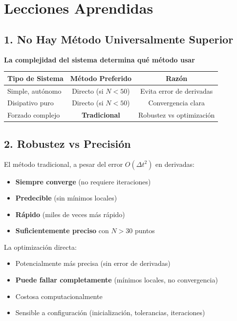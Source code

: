 \documentclass[11pt,a4paper]{article}
\begin{document}
\section{Lecciones Aprendidas}

\subsection{1. No Hay Método Universalmente Superior}

\begin{center}
\textbf{La complejidad del sistema determina qué método usar}
\end{center}

\begin{table}[H]
\centering
\begin{tabular}{lcc}
\toprule
\textbf{Tipo de Sistema} & \textbf{Método Preferido} & \textbf{Razón} \\
\midrule
Simple, autónomo & Directo (si $N < 50$) & Evita error de derivadas \\
Disipativo puro & Directo (si $N < 50$) & Convergencia clara \\
\rowcolor{yellow!30}
Forzado complejo & \textbf{Tradicional} & Robustez vs optimización \\
\bottomrule
\end{tabular}
\end{table}

\subsection{2. Robustez vs Precisión}

El método tradicional, a pesar del error $O(\Delta t^2)$ en derivadas:
\begin{itemize}
\item \textbf{Siempre converge} (no requiere iteraciones)
\item \textbf{Predecible} (sin mínimos locales)
\item \textbf{Rápido} (miles de veces más rápido)
\item \textbf{Suficientemente preciso} con $N > 30$ puntos
\end{itemize}

La optimización directa:
\begin{itemize}
\item Potencialmente más precisa (sin error de derivadas)
\item \textbf{Puede fallar completamente} (mínimos locales, no convergencia)
\item Costosa computacionalmente
\item Sensible a configuración (inicialización, tolerancias, iteraciones)
\end{itemize}
\end{document}
